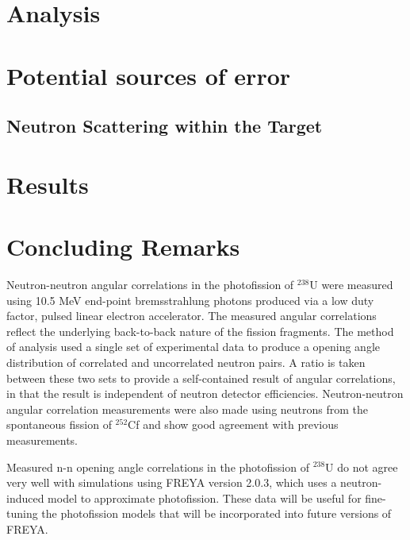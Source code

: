 \documentclass[%
 reprint,
 calc,
 amsmath,amssymb,
 aps,
 nofootinbib,
 linenumbers
]{revtex4-1}
\begin{document}
\section{Analysis}
\label{Analysis}


\section{Potential sources of error}


\subsection{Neutron Scattering within the Target}


\section{Results}


\section{Concluding Remarks}
Neutron-neutron angular correlations in the photofission of $^{238}$U were measured using 10.5 MeV end-point bremsstrahlung photons produced via a low duty factor, pulsed linear electron accelerator.
The measured angular correlations reflect the underlying back-to-back nature of the fission fragments.
The method of analysis used a single set of experimental data to produce a opening angle distribution of correlated and uncorrelated neutron pairs.
A ratio is taken between these two sets to provide a self-contained result of angular correlations, in that the result is independent of neutron detector efficiencies.
Neutron-neutron angular correlation measurements were also made using neutrons from the spontaneous fission of $^{252}$Cf and show good agreement with previous measurements.

Measured n-n opening angle correlations in the photofission of $^{238}$U do not agree very well with simulations using FREYA version 2.0.3, which uses a neutron-induced model to approximate photofission.
These data will be useful for fine-tuning the photofission models that will be incorporated into future versions of FREYA.
\end{document}

